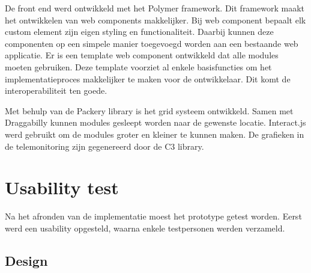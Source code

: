\documentclass{article}
\begin{document}
    De front end werd ontwikkeld met het Polymer framework. Dit framework maakt het ontwikkelen van web components makkelijker. Bij web component bepaalt elk custom element zijn eigen styling en functionaliteit. Daarbij kunnen deze componenten op een simpele manier toegevoegd worden aan een bestaande web applicatie. Er is een template web component ontwikkeld dat alle modules moeten gebruiken. Deze template voorziet al enkele basisfuncties om het implementatieproces makkelijker te maken voor de ontwikkelaar. Dit komt de interoperabiliteit ten goede. 

    Met behulp van de Packery library is het grid systeem ontwikkeld. Samen met Draggabilly kunnen modules gesleept worden naar de gewenste locatie. Interact.js werd gebruikt om de modules groter en kleiner te kunnen maken. De grafieken in de telemonitoring zijn gegenereerd door de C3 library.

\section{Usability test}

Na het afronden van de implementatie moest het prototype getest worden. Eerst werd een usability opgesteld, waarna enkele testpersonen werden verzameld.

    \subsection{Design}
\end{document}
